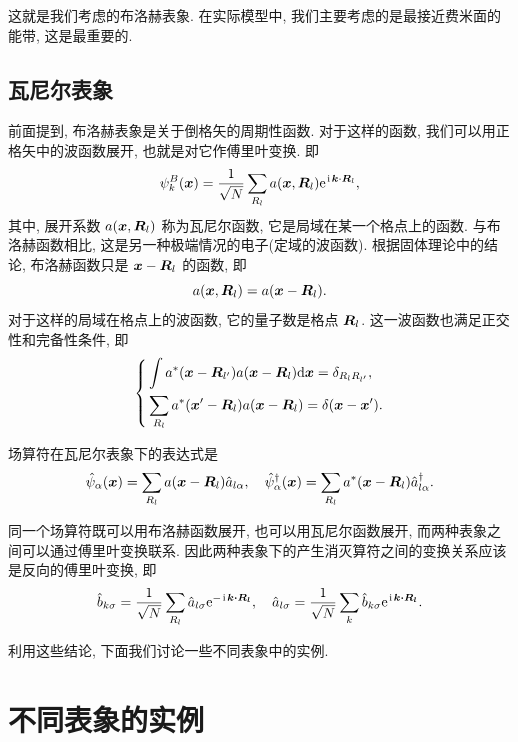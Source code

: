 这就是我们考虑的布洛赫表象. 在实际模型中, 我们主要考虑的是最接近费米面的能带, 这是最重要的. 
\subsection{瓦尼尔表象}

前面提到, 布洛赫表象是关于倒格矢的周期性函数. 对于这样的函数, 我们可以用正格矢中的波函数展开, 也就是对它作傅里叶变换. 即
\begin{equation}
   \psi_{ k}^B(\boldsymbol{x})=\frac{1}{\sqrt{N}}\sum_{ R_l}a(\boldsymbol{x}, \boldsymbol{R}_l)\mathrm{e}^{\hspace{0.1em}\mathrm{i}\hspace{0.1em}\boldsymbol{k}\cdot \boldsymbol{R}_l}, 
\end{equation}
其中, 展开系数 $a(\boldsymbol{x}, \boldsymbol{R}_l)$ 称为瓦尼尔函数, 它是局域在某一个格点上的函数. 与布洛赫函数相比, 这是另一种极端情况的电子(定域的波函数). 根据固体理论中的结论, 布洛赫函数只是 $\boldsymbol{x}-\boldsymbol{R}_l$ 的函数, 即
\begin{equation}
   a(\boldsymbol{x}, \boldsymbol{R}_l)=a(\boldsymbol{x}-\boldsymbol{R}_l). 
\end{equation}
对于这样的局域在格点上的波函数, 它的量子数是格点 $\boldsymbol{R}_l$. 这一波函数也满足正交性和完备性条件, 即
\begin{equation}
   \left\{
\begin{aligned}
   &\int a^*(\boldsymbol{x}-\boldsymbol{R}_{l'})a(\boldsymbol{x}-\boldsymbol{R}_l)\mathrm{d}\boldsymbol{x}=\delta_{ R_l R_{l'}}, \\
   &\sum_{ R_l}a^*(\boldsymbol{x}'-\boldsymbol{R}_l)a(\boldsymbol{x}-\boldsymbol{R}_l)=\delta(\boldsymbol{x}-\boldsymbol{x}'). 
\end{aligned}
   \right. 
\end{equation}

场算符在瓦尼尔表象下的表达式是
\begin{equation}
   \hat\psi_\alpha(\boldsymbol{x})=\sum_{ R_l}a(\boldsymbol{x}-\boldsymbol{R}_l)\hat a_{l\alpha}, \quad \hat\psi_\alpha^\dagger(\boldsymbol{x})=\sum_{ R_l}a^*(\boldsymbol{x}-\boldsymbol{R}_l)\hat a_{l\alpha}^\dagger. 
\end{equation}

同一个场算符既可以用布洛赫函数展开, 也可以用瓦尼尔函数展开, 而两种表象之间可以通过傅里叶变换联系. 因此两种表象下的产生消灭算符之间的变换关系应该是反向的傅里叶变换, 即
\begin{equation}
   \hat b_{ k\sigma}=\frac{1}{\sqrt{N}}\sum_{ R_l}\hat a_{l\sigma}\mathrm{e}^{-\hspace{0.1em}\mathrm{i}\hspace{0.1em} \boldsymbol{k\cdot R_l}}, \quad \hat a_{l\sigma}=\frac{1}{\sqrt{N}}\sum_{ k}\hat b_{k\sigma}\mathrm{e}^{\hspace{0.1em}\mathrm{i}\hspace{0.1em}\boldsymbol{k\cdot R_l}}. 
\end{equation}

利用这些结论, 下面我们讨论一些不同表象中的实例. 

\section{不同表象的实例}
